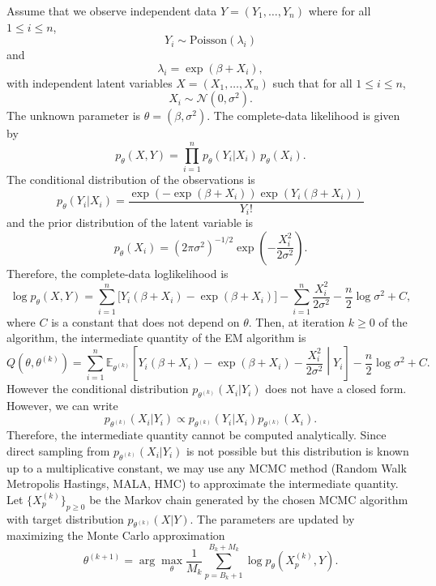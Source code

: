 \documentclass[english,graybox,envcountchap,envcountsame,sectrefs,shortlabels]{svmono}
\theoremstyle{style}
\newcommand{\eqsp}{}
\begin{document}
\begin{example}
Assume that we observe independent data $Y = (Y_1,\ldots,Y_n)$
where for all $1\leq i \leq n$,
\[
Y_i \sim \text{Poisson}(\lambda_i)
\]
and
\[
\lambda_i = \exp(\beta + X_i)\eqsp,
\]
with independent latent variables $X=(X_1,\ldots,X_n)$ such that for all $1\leq i \leq n$,
\[
X_i \sim \mathcal{N}(0,\sigma^2)\eqsp.
\]
The unknown parameter is $\theta = (\beta,\sigma^2)$. The complete-data likelihood is given by
\[
p_\theta(X,Y)
=
\prod_{i=1}^n
p_\theta(Y_i|X_i)\,p_\theta(X_i)\eqsp.
\]
The conditional distribution of the observations is
\[
p_\theta(Y_i|X_i)
=
\frac{\exp(-\exp(\beta+X_i))\exp(Y_i(\beta+X_i))}{Y_i!}
\]
and the prior distribution of the latent variable is
\[
p_\theta(X_i)
=
(2\pi\sigma^2)^{-1/2}
\exp\left(-\frac{X_i^2}{2\sigma^2}\right)\eqsp.
\]
Therefore, the complete-data loglikelihood is 
\[
\log p_\theta(X,Y) = \sum_{i=1}^n \Big[ Y_i(\beta+X_i)-\exp(\beta+X_i)\Big]-\sum_{i=1}^n\frac{X_i^2}{2\sigma^2}
-
\frac{n}{2}\log\sigma^2 + C\eqsp,
\]
where $C$ is a constant that does not depend on $\theta$. Then, at iteration $k\geq 0$ of the algorithm, the intermediate quantity of the EM algorithm is 
\[
Q(\theta,\theta^{(k)})
=
\sum_{i=1}^n \mathbb{E}_{\theta^{(k)}}
\left[
  Y_i(\beta+X_i)-\exp(\beta+X_i)- \frac{X_i^2}{2\sigma^2}
 \middle| Y_i
\right]  -
\frac{n}{2}\log\sigma^2 + C\eqsp.
\]
However the conditional distribution $p_{\theta^{(k)}}(X_i|Y_i)$ does not have a closed form. However, we can write
\[
p_{\theta^{(k)}}(X_i|Y_i)
\propto
p_{\theta^{(k)}}(Y_i|X_i)p_{\theta^{(k)}}(X_i)\eqsp.
\]
Therefore, the intermediate quantity  cannot be computed analytically. 
Since direct sampling from \(p_{\theta^{(k)}}(X_i|Y_i)\) is not possible but this distribution is known up to a multiplicative constant, we may use any MCMC method  (Random Walk Metropolis Hastings, MALA, HMC) to approximate the intermediate quantity. Let $\{X^{(k)}_{p}\}_{p\geq 0}$ be the Markov chain generated by the chosen MCMC algorithm with target distribution $p_{\theta^{(k)}}(X|Y)$.  The parameters are updated by maximizing the Monte Carlo approximation
\[
\theta^{(k+1)}
=
\arg\max_{\theta}
\frac{1}{M_k}
\sum_{p=B_k+1}^{B_k+M_k}
\log p_\theta(X^{(k)}_{p},Y)\eqsp.
\]
%
%
%
%

\end{example}
\end{document}
